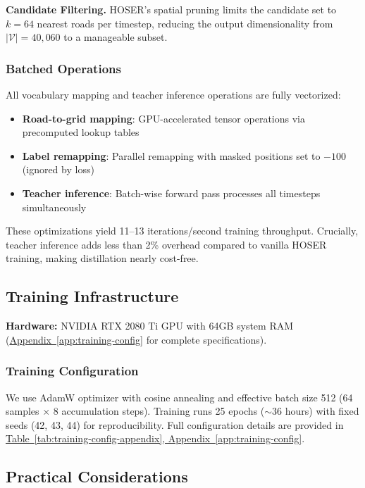\textbf{Candidate Filtering.} HOSER's spatial pruning limits the candidate set to $k = 64$ nearest roads per timestep, reducing the output dimensionality from $|\mathcal{V}| = 40{,}060$ to a manageable subset.

\subsubsection{Batched Operations}

All vocabulary mapping and teacher inference operations are fully vectorized:

\begin{itemize}[noitemsep,topsep=0pt]
    \item \textbf{Road-to-grid mapping}: GPU-accelerated tensor operations via precomputed lookup tables
    \item \textbf{Label remapping}: Parallel remapping with masked positions set to $-100$ (ignored by loss)
    \item \textbf{Teacher inference}: Batch-wise forward pass processes all timesteps simultaneously
\end{itemize}

These optimizations yield 11--13 iterations/second training throughput. Crucially, teacher inference adds less than 2\% overhead compared to vanilla HOSER training, making distillation nearly cost-free.

\subsection{Training Infrastructure}
\label{sec:impl-infra}

\textbf{Hardware:} NVIDIA RTX 2080 Ti GPU with 64GB system RAM (\hyperref[app:training-config]{Appendix~\ref*{app:training-config}} for complete specifications).

\subsubsection{Training Configuration}

We use AdamW optimizer with cosine annealing and effective batch size 512 (64 samples $\times$ 8 accumulation steps). Training runs 25 epochs ($\sim$36 hours) with fixed seeds (42, 43, 44) for reproducibility. Full configuration details are provided in \hyperref[app:training-config]{Table~\ref*{tab:training-config-appendix}, Appendix~\ref*{app:training-config}}.

\subsection{Practical Considerations}
\label{sec:impl-practical}

